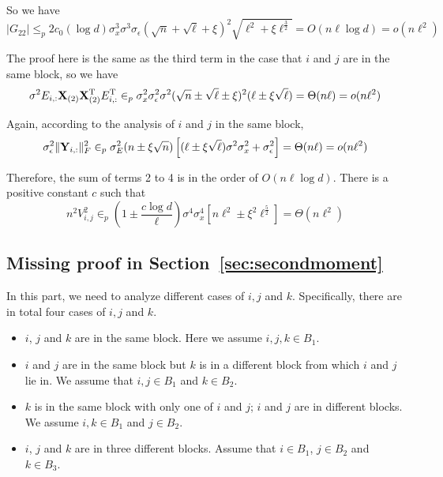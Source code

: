 So we have 
\begin{equation}
    |G_{22}| 
    \leq_p 2c_0 (\log d) \sigma^3_x\sigma^3 \sigma_{\epsilon} (\sqrt{n} + \sqrt{\ell} + \xi)^2 \sqrt{\ell^2  + \xi \ell^{\frac{3}{2}}} 
    = O(n \ell \log d)
    = o(n \ell^2)
\end{equation}



The proof here is the same as the third term in the case that $i$ and $j$ are in the same block, so we have
\begin{equation}
    \sigma^2 E_{i,:}\mathbf{X}_{(2)} \mathbf{X}_{(2)}^{\mathrm{T}} E^{\mathrm{T}}_{i,:}
    \in_{p} 
    \sigma^2_x \sigma^2_{\epsilon}\sigma^2 (\sqrt{n} \pm \sqrt{\ell} \pm \xi)^2 (\ell \pm \xi\sqrt{\ell})
    =\Theta(n\ell)
    = o(n\ell^2)
\end{equation}


Again, according to the analysis of $i$ and $j$ in the same block,
\begin{equation}
     \sigma^2_{\epsilon}\|\mathbf{Y}_{i,:}\|^2_F 
     \in_{p} \sigma^2_{E}(n \pm \xi \sqrt{n})\left[(\ell \pm \xi \sqrt{\ell})\sigma^2\sigma^2_x + \sigma^2_{\epsilon} \right]
     =\Theta(n\ell)
     = o(n\ell^2)
\end{equation}

Therefore, the sum of terms 2 to 4 is in the order of $ O(n \ell \log d)$.
There is a positive constant $c$ such that 
\begin{equation}
    n^2V^2_{i,j} 
    \in_{p} (1 \pm \frac{c\log d}{\ell}) \sigma^4\sigma^4_x [n \ell^2 \pm \xi^2 \ell^{\frac{5}{2}}]
    = \Theta(n \ell^2)
\end{equation}

\subsection{Missing proof in Section~\ref{sec:secondmoment}}

In this part, we need to analyze different cases of $i,j$ and $k$. Specifically, there are in total four cases of $i,j$ and $k$.
\begin{itemize}
    \item $i$, $j$ and $k$ are in the same block. Here we assume $i, j, k \in B_1$.
    \item $i$ and $j$ are in the same block but $k$ is in a different block from which $i$ and $j$ lie in. We assume that $i,j \in B_1$ and $k \in B_2$.
    \item $k$ is in the same block with only one of $i$ and $j$; $i$ and $j$ are in different blocks. We assume $i,k \in B_1$ and $j \in B_2$.
    \item $i$, $j$ and $k$ are in three different blocks. Assume that $i \in B_1$, $j \in B_2$ and $k \in B_3$.
\end{itemize}

